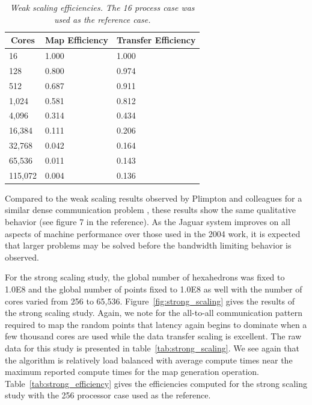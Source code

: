 \documentclass{mc2013}
\begin{document}
\begin{table}[htpb!]
  \begin{center}
    \begin{tabular}{lll}\hline\hline
      \multicolumn{1}{c}{Cores}& 
      \multicolumn{1}{c}{Map Efficiency} & 
      \multicolumn{1}{c}{Transfer Efficiency}\\\hline\hline
      16 &	1.000 &	1.000 \\
      128 &	0.800 &	0.974 \\
      512 &	0.687 &	0.911 \\
      1,024 &	0.581 &	0.812 \\
      4,096 &	0.314 &	0.434 \\
      16,384 &	0.111 &	0.206 \\
      32,768 &	0.042 &	0.164 \\
      65,536 &	0.011 &	0.143 \\
      115,072 &	0.004 &	0.136 \\
      \hline\hline
    \end{tabular}
  \end{center}
  \caption{\sl Weak scaling efficiencies. The 16 process case was used
    as the reference case.}
  \label{tab:weak_efficiency}
\end{table}

Compared to the weak scaling results observed by Plimpton and
colleagues for a similar dense communication problem
\cite{Plimpton_2004}, these results show the same qualitative behavior
(see figure 7 in the reference). As the Jaguar system improves on all
aspects of machine performance over those used in the 2004 work, it is
expected that larger problems may be solved before the bandwidth
limiting behavior is observed.

\label{subsec:strong_scaling}
For the strong scaling study, the global number of hexahedrons was
fixed to 1.0E8 and the global number of points fixed to 1.0E8 as well
with the number of cores varied from 256 to
65,536. Figure~\ref{fig:strong_scaling} gives the results of the
strong scaling study. Again, we note for the all-to-all communication
pattern required to map the random points that latency again begins to
dominate when a few thousand cores are used while the data transfer
scaling is excellent. The raw data for this study is presented in
table~\ref{tab:strong_scaling}. We see again that the algorithm is
relatively load balanced with average compute times near the maximum
reported compute times for the map generation
operation. Table~\ref{tab:strong_efficiency} gives the efficiencies
computed for the strong scaling study with the 256 processor case used
as the reference.
\end{document}
